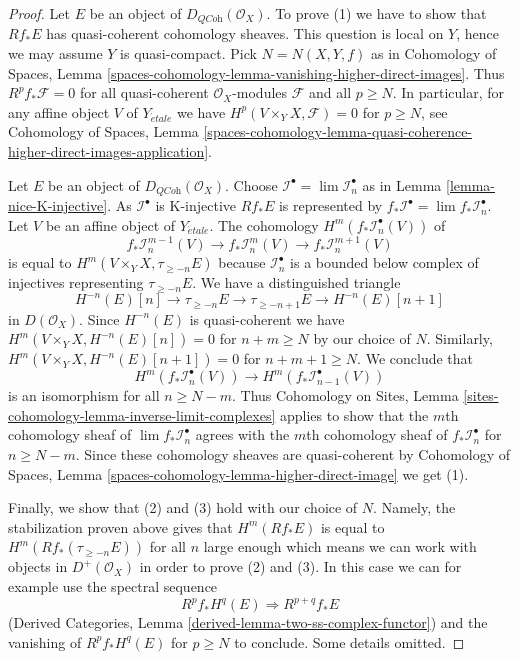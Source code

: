\begin{proof}
Let $E$ be an object of $D_{\textit{QCoh}}(\mathcal{O}_X)$.
To prove (1) we have to show that $Rf_*E$ has quasi-coherent
cohomology sheaves. This question is local on $Y$, hence we may
assume $Y$ is quasi-compact. Pick $N = N(X, Y, f)$ as in
Cohomology of Spaces, Lemma
\ref{spaces-cohomology-lemma-vanishing-higher-direct-images}.
Thus $R^pf_*\mathcal{F} = 0$ for all quasi-coherent $\mathcal{O}_X$-modules
$\mathcal{F}$ and all $p \geq N$. In particular, for any affine
object $V$ of $Y_{\acute{e}tale}$ we have $H^p(V \times_Y X, \mathcal{F}) = 0$
for $p \geq N$, see
Cohomology of Spaces, Lemma
\ref{spaces-cohomology-lemma-quasi-coherence-higher-direct-images-application}.

\medskip\noindent
Let $E$ be an object of $D_{\textit{QCoh}}(\mathcal{O}_X)$.
Choose $\mathcal{I}^\bullet = \lim \mathcal{I}_n^\bullet$
as in Lemma \ref{lemma-nice-K-injective}.
As $\mathcal{I}^\bullet$ is K-injective $Rf_*E$ is represented by
$f_*\mathcal{I}^\bullet = \lim f_*\mathcal{I}_n^\bullet$.
Let $V$ be an affine object of $Y_{\acute{e}tale}$. The cohomology
$H^m(f_*\mathcal{I}_n^\bullet(V))$ of
$$
f_*\mathcal{I}_n^{m - 1}(V) \to
f_*\mathcal{I}_n^m(V) \to
f_*\mathcal{I}_n^{m + 1}(V)
$$
is equal to $H^m(V \times_Y X, \tau_{\geq -n}E)$ because
$\mathcal{I}_n^\bullet$ is a bounded below complex of injectives
representing $\tau_{\geq -n}E$. We have a distinguished triangle
$$
H^{-n}(E)[n] \to \tau_{\geq -n}E \to \tau_{\geq - n + 1}E \to H^{-n}(E)[n + 1]
$$
in $D(\mathcal{O}_X)$. Since $H^{-n}(E)$ is quasi-coherent we have
$H^m(V \times_Y X, H^{-n}(E)[n]) = 0$ for $n + m \geq N$ by
our choice of $N$. Similarly, $H^m(V \times_Y X, H^{-n}(E)[n + 1]) = 0$
for $n + m + 1 \geq N$. We conclude that
$$
H^m(f_*\mathcal{I}_n^\bullet(V)) \to H^m(f_*\mathcal{I}_{n - 1}^\bullet(V))
$$
is an isomorphism for all $n \geq N - m$. Thus
Cohomology on Sites, Lemma \ref{sites-cohomology-lemma-inverse-limit-complexes}
applies to show that the $m$th cohomology sheaf of
$\lim f_*\mathcal{I}_n^\bullet$ agrees with the $m$th cohomology
sheaf of $f_*\mathcal{I}_n^\bullet$ for $n \geq N - m$. Since these
cohomology sheaves are quasi-coherent by
Cohomology of Spaces, Lemma \ref{spaces-cohomology-lemma-higher-direct-image}
we get (1).

\medskip\noindent
Finally, we show that (2) and (3) hold with our choice of $N$.
Namely, the stabilization proven above gives that $H^m(Rf_*E)$ is equal
to $H^m(Rf_*(\tau_{\geq -n}E))$ for all $n$ large enough which means we
can work with objects in $D^+(\mathcal{O}_X)$ in order to prove (2) and (3).
In this case we can for example use the spectral sequence
$$
R^pf_*H^q(E) \Rightarrow R^{p + q}f_*E
$$
(Derived Categories, Lemma \ref{derived-lemma-two-ss-complex-functor})
and the vanishing of $R^pf_*H^q(E)$ for $p \geq N$ to conclude.
Some details omitted.
\end{proof}

